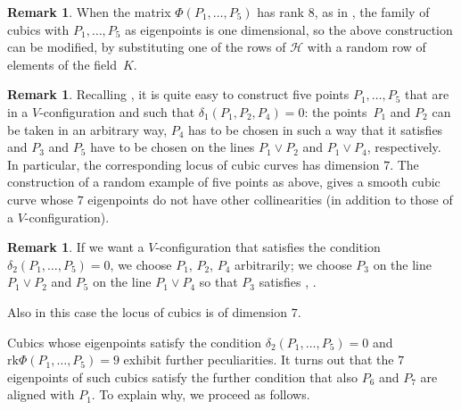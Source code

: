 \documentclass{amsart}
\theoremstyle{plain}
\theoremstyle{definition}
\newtheorem{rmk}[lemma]{Remark}
\newcommand{\rk}{\ensuremath{\mathrm{rk}}}
\begin{document}
\begin{rmk}
When the matrix $\Phi(P_1, \dots, P_5)$ has rank $8$, as in , the family of
cubics with $P_1, \dots, P_5$ as eigenpoints is one dimensional, so the
above construction can be modified, by substituting one of the rows of
$\mathcal{H}$ with a random row of elements of the field~$K$.
\end{rmk}

\begin{rmk}
\label{rmk:construction_five_d1}
Recalling , it is quite easy to construct five points $P_1, \dots, P_5$ that are in a $V$-configuration
and such that $\delta_1(P_1, P_2, P_4)= 0$: the points~$P_1$
and $P_2$ can be taken in an arbitrary way, $P_4$ has to be chosen in such
a way that it satisfies 
and $P_3$ and $P_5$ have to be chosen on the lines $P_1 \vee P_2$ and $P_1 \vee P_4$,
respectively. In particular, the corresponding locus of cubic curves
has dimension $7$.
The construction of a random example
of five points as above, gives a smooth cubic curve whose $7$ eigenpoints
do not have other collinearities (in addition to those of a
$V$-configuration).
\end{rmk}

\begin{rmk}
\label{rmk:construction_five_d2}
If we want a $V$-configuration that satisfies the condition
$\delta_2(P_1, \dots, P_5) = 0$, we choose $P_1$, $P_2$, $P_4$ arbitrarily; 
we choose $P_3$ on the line $P_1 \vee P_2$ and $P_5$ on the line $P_1 \vee P_4$ so that $P_3$ satisfies , .

Also in this case the locus of cubics is of dimension $7$.
\end{rmk}

Cubics whose eigenpoints satisfy the condition $\delta_2(P_1, \dotsc, P_5) = 0$ and $\rk \Phi(P_1, \dotsc, P_5) = 9$ exhibit further peculiarities. It turns out that the $7$ eigenpoints of such cubics satisfy the further
condition that also $P_6$ and $P_7$ are aligned with $P_1$. To explain
why, we proceed as follows.
\end{document}
